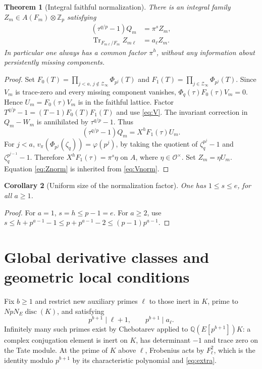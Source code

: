 \documentclass[11pt]{article}
\newtheorem{theorem}{Theorem}[section]
\newtheorem{corollary}[theorem]{Corollary}
\theoremstyle{definition}\newtheorem{definition}[theorem]{Definition}
\theoremstyle{remark}\newtheorem{remark}[theorem]{Remark}
\newcommand{\Zp}{\mathbb Z_p}\newcommand{\Qp}{\mathbb Q_p}
\newcommand{\OO}{\mathcal O}\newcommand{\Tr}{\operatorname{Tr}}
\begin{document}
\begin{theorem}[Integral faithful normalization]\label{thm:faithful}
There is an integral family $Z_m\in A(F_m)\otimes\Zp$ satisfying
\begin{align}
 (\tau^{q/p}-1)Q_m&=\pi^s Z_m,\label{eq:faith}\\
 \Tr_{F_{m\ell}/F_m}Z_{m\ell}&=a_\ell Z_m.\label{eq:Znorm}
\end{align}
In particular one always has a common factor $\pi^h$, without any information about persistently missing components.
\end{theorem}
\begin{proof}
Set $F_0(T)=\prod_{j<a,\,j\notin\mathcal Z_\infty}\Phi_{p^j}(T)$ and $F_1(T)=\prod_{j\in\mathcal Z_\infty}\Phi_{p^j}(T)$. Since $V_m$ is trace-zero and every missing component vanishes, $\Phi_q(\tau)F_0(\tau)V_m=0$. Hence $U_m=F_0(\tau)V_m$ is in the faithful lattice. Factor $T^{q/p}-1=(T-1)F_0(T)F_1(T)$ and use \eqref{eq:V}. The invariant correction in $Q_m-W_m$ is annihilated by $\tau^{q/p}-1$. Thus
\[
 (\tau^{q/p}-1)Q_m=X^hF_1(\tau)U_m.
\]
For $j<a$, $v_\pi(\Phi_{p^j}(\zeta_q))=\varphi(p^j)$, by taking the quotient of $\zeta_q^{p^j}-1$ and $\zeta_q^{p^{j-1}}-1$. Therefore $X^hF_1(\tau)=\pi^s\eta$ on $A$, where $\eta\in\OO^\times$. Set $Z_m=\eta U_m$. Equation \eqref{eq:Znorm} is inherited from \eqref{eq:Vnorm}.
\end{proof}

\begin{corollary}[Uniform size of the normalization factor]\label{cor:s}
One has $1\le s\le e$, for all $a\ge1$.
\end{corollary}
\begin{proof}
For $a=1$, $s=h\le p-1=e$. For $a\ge2$, use $s\le h+p^{a-1}-1\le p+p^{a-1}-2\le(p-1)p^{a-1}$.
\end{proof}

\section{Global derivative classes and geometric local conditions}
Fix $b\ge1$ and restrict new auxiliary primes $\ell$ to those inert in $K$, prime to $NpN_E\operatorname{disc}(K)$, and satisfying
\begin{equation}\label{eq:extra}
 p^{b+1}\mid \ell+1,\qquad p^{b+1}\mid a_\ell.
\end{equation}
Infinitely many such primes exist by Chebotarev applied to $\mathbb Q(E[p^{b+1}])K$: a complex conjugation element is inert on $K$, has determinant $-1$ and trace zero on the Tate module. At the prime of $K$ above $\ell$, Frobenius acts by $F_\ell^2$, which is the identity modulo $p^{b+1}$ by its characteristic polynomial and \eqref{eq:extra}.
\end{document}
